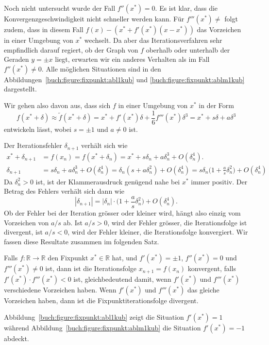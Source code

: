 Noch nicht untersucht wurde der Fall $f''(x^*)=0$.
Es ist klar, dass die Konvergenzgeschwindigkeit nicht schneller
werden kann.
Für $f'''(x^*)\ne $ folgt zudem, dass in diesem Fall
$f(x)-(x^* + f'(x^*)(x-x^*))$
das Vorzeichen in einer Umgebung von $x^*$ wechselt.
Da aber das Iterationsverfahren sehr empfindlich darauf regiert, ob
der Graph von $f$ oberhalb oder unterhalb der Geraden $y=\pm x$ 
liegt, erwarten wir ein anderes Verhalten als im Fall $f''(x^*)\ne 0$.
%
Alle möglichen Situationen sind in den
Abbildungen~\ref{buch:figure:fixpunkt:abl1kub} und
\ref{buch:figure:fixpunkt:ablm1kub} dargestellt.

Wir gehen also davon aus, dass sich $f$ in einer Umgebung von $x^*$
in der Form
\[
f(x^*+\delta)
\approx
\tilde{f}(x^*+\delta)
=
x^* + f'(x^*)\delta + \frac1{6}f'''(x^*) \delta^3
=
x^* + s\delta + a\delta^3
\]
entwickeln lässt, wobei $s=\pm 1$ und $a\ne 0$ ist.

Der Iterationsfehler $\delta_{n+1}$ verhält sich wie
\begin{align*}
x^* + \delta_{n+1}
&=
f(x_n)
=
f(x^* + \delta_n)
=
x^* + s\delta_n + a\delta_n^3 + O(\delta_n^4).
\\
\delta_{n+1}
&=
s\delta_n + a\delta_n^3 + O(\delta_n^4)
=
\delta_n(s+a\delta_n^2) + O(\delta_n^4)
=
s\delta_n\biggl(1+\frac{a}{s}\delta_n^2\biggr) + O(\delta_n^4)
\end{align*}
Da $\delta_n^2>0$ ist, ist der Klammerausdruck genügend nahe bei $x^*$
immer positiv.
Der Betrag des Fehlers verhält sich dann wie
\[
|\delta_{n+1}|
=
|\delta_n| \cdot \biggl(1 + \frac{a}{s}\delta_n^2\biggr) + O(\delta_n^4).
\]
Ob der Fehler bei der Iteration grösser oder kleiner wird, hängt also
einzig vom Vorzeichen von $a/s$ ab.
Ist $a/s > 0$, wird der Fehler grösser, die Iterationsfolge ist divergent,
ist $a/s < 0$, wird der Fehler kleiner, die Iterationsfolge konvergiert.
Wir fassen diese Resultate zusammen im folgenden Satz.

\begin{satz}
Falls $f\colon\mathbb R\to\mathbb R$ den Fixpunkt $x^*\in\mathbb R$ hat,
und $f'(x^*)=\pm1$, $f''(x^*)=0$ und $f'''(x^*)\ne 0$ ist, dann ist die
Iterationsfolge $x_{n+1}=f(x_n)$ konvergent, falls $f'(x^*)\cdot f'''(x^*)<0$
ist, gleichbedeutend damit, wenn $f'(x^*)$ und $f'''(x^*)$ verschiedene
Vorzeichen haben.
Wenn $f'(x^*)$ und $f'''(x^*)$ das gleiche Vorzeichen haben, dann ist
die Fixpunktiterationsfolge divergent.
\end{satz}

Abbildung~\ref{buch:figure:fixpunkt:abl1kub} zeigt die Situation $f'(x^*)=1$
während Abbildung~\ref{buch:figure:fixpunkt:ablm1kub} die Situation
$f'(x^*)=-1$ abdeckt.

